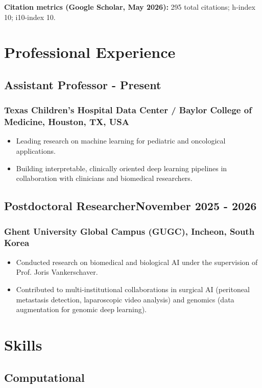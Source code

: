 \documentclass[11pt]{article}
\begin{document}
\bigskip
\noindent\textbf{Citation metrics (Google Scholar, May 2026):} 295 total citations; h-index 10; i10-index 10.

\section{Professional Experience}
\subsection{Assistant Professor\hfill {} - Present}
\subsubsection{Texas Children's Hospital Data Center / Baylor College of Medicine, Houston, TX, USA}
\begin{itemize}
    \item[\checkmark] Leading research on machine learning for pediatric and oncological applications.
    \item[\checkmark] Building interpretable, clinically oriented deep learning pipelines in collaboration with clinicians and biomedical researchers.
\end{itemize}

\subsection{Postdoctoral Researcher\hfill \normalfont November 2025 - 2026}
\subsubsection{Ghent University Global Campus (GUGC), Incheon, South Korea}
\begin{itemize}
    \item[\checkmark] Conducted research on biomedical and biological AI under the supervision of Prof. Joris Vankerschaver.
    \item[\checkmark] Contributed to multi-institutional collaborations in surgical AI (peritoneal metastasis detection, laparoscopic video analysis) and genomics (data augmentation for genomic deep learning).
\end{itemize}

\section{Skills}
\subsection{Computational}
\end{document}
